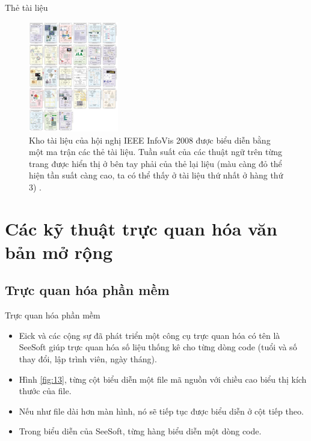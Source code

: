 \documentclass[10pt]{beamer}
\theoremstyle{remark}
\theoremstyle{definition}
\begin{document}
\begin{frame}{Thẻ tài liệu}
	\begin{figure}[h!]
        \centering
        \includegraphics[width=0.35\textwidth]{12.png}
        \caption{Kho tài liệu của hội nghị IEEE InfoVis 2008 được biểu diễn bằng một ma trận các thẻ tài liệu.
        Tuần suất của các thuật ngữ trên từng trang được hiển thị ở bên tay phải của thẻ lại liệu (màu càng đỏ thể hiện tần suất càng cao, ta có thể thấy ở tài liệu thứ nhất ở hàng thứ 3) \cite{400}.}
        \label{fig:12}
    \end{figure}
\end{frame}

\section{Các kỹ thuật trực quan hóa văn bản mở rộng}

\subsection{Trực quan hóa phần mềm}

\begin{frame}{Trực quan hóa phần mềm}
	\begin{itemize}
		\item Eick và các cộng sự đã phát triển một công cụ trực quan hóa có tên là SeeSoft \cite{108} giúp trực quan hóa số liệu thống kê cho từng dòng code (tuổi và số thay đổi, lập trình viên, ngày tháng).
		\item Hình \ref{fig:13}, từng cột biểu diễn một file mã nguồn với chiều cao biểu thị kích thước của file.
		\item Nếu như file dài hơn màn hình, nó sẽ tiếp tục được biểu diễn ở cột tiếp theo.
		\item Trong biểu diễn của SeeSoft, từng hàng biểu diễn một dòng code.
	\end{itemize}
\end{frame}
\end{document}
